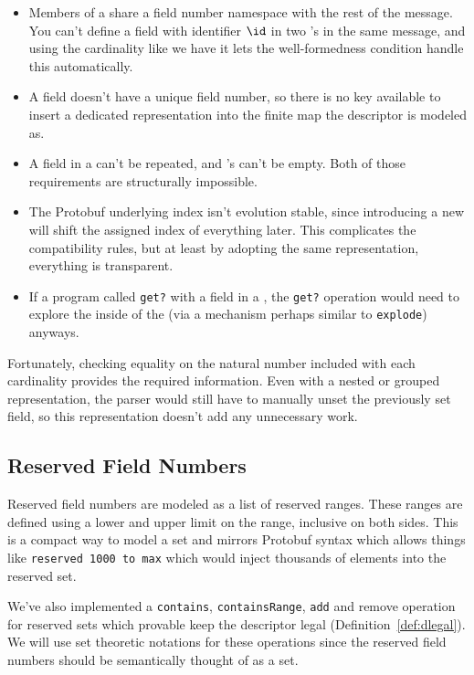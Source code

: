 \begin{itemize}
\item Members of a \Oneof{} share a field number namespace with the rest
  of the message. You can't define a field with identifier $\id$ in two
  \Oneof{}'s in the same message, and using the \Oneof{} cardinality
  like we have it lets the well-formedness condition handle this automatically.
\item A \Oneof{} field doesn't have a unique field number, so there is no
  key available to insert a dedicated \Oneof{} representation into the
  finite map the descriptor is modeled as.
\item A field in a \Oneof{} can't be repeated, and \Oneof{}'s can't
  be empty. Both of those requirements are structurally impossible.
\item The Protobuf underlying \Oneof{} index isn't evolution stable, since
  introducing a new \Oneof{} will shift the assigned index of everything
  later. This complicates the \Oneof{} compatibility rules, but at least
  by adopting the same representation, everything is transparent.
\item If a program called \texttt{get?} with a field in a \Oneof{}, the
  \texttt{get?} operation would need to explore the inside of the \Oneof{}
  (via a mechanism perhaps similar to \texttt{explode}) anyways.
\end{itemize}

Fortunately, checking equality on the natural number included with each
\Oneof{} cardinality provides the required information. Even with a nested
or grouped representation, the parser would still have to manually unset the
previously set field, so this representation doesn't add any unnecessary work.

\subsection{Reserved Field Numbers}

Reserved field numbers are modeled as a list of reserved ranges. These ranges
are defined using a lower and upper limit on the range, inclusive on both
sides. This is a compact way to model a set and mirrors Protobuf syntax which
allows things like \texttt{reserved 1000 to max} which would inject thousands of
elements into the reserved set. 

We've also implemented a \texttt{contains}, \texttt{containsRange}, \texttt{add}
and \textrm{remove} operation for reserved sets which provable keep the
descriptor legal (Definition~\ref{def:dlegal}). We will use set theoretic
notations for these operations since the reserved field numbers should be
semantically thought of as a set.

